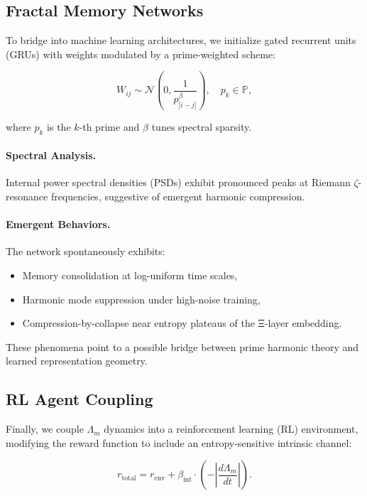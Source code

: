 \documentclass[12pt]{article}
\theoremstyle{plain}
\begin{document}
\subsection{Fractal Memory Networks}

To bridge into machine learning architectures, we initialize gated recurrent units (GRUs) with weights modulated by a prime-weighted scheme:

\begin{equation}
W_{ij} \sim \mathcal{N}\left(0, \frac{1}{p_{|i-j|}^\beta} \right), \quad p_k \in \mathbb{P},
\end{equation}

where $p_k$ is the $k$-th prime and $\beta$ tunes spectral sparsity.

\paragraph{Spectral Analysis.} Internal power spectral densities (PSDs) exhibit pronounced peaks at Riemann $\zeta$-resonance frequencies, suggestive of emergent harmonic compression.

\paragraph{Emergent Behaviors.} The network spontaneously exhibits:
\begin{itemize}
    \item Memory consolidation at log-uniform time scales,
    \item Harmonic mode suppression under high-noise training,
    \item Compression-by-collapse near entropy plateaus of the Ξ-layer embedding.
\end{itemize}

These phenomena point to a possible bridge between prime harmonic theory and learned representation geometry.

\subsection{RL Agent Coupling}

Finally, we couple $\Lambda_m$ dynamics into a reinforcement learning (RL) environment, modifying the reward function to include an entropy-sensitive intrinsic channel:

\begin{equation}
r_{\text{total}} = r_{\text{env}} + \beta_{\text{int}} \cdot \left( -\left|\frac{d\Lambda_m}{dt} \right| \right).
\end{equation}
\end{document}
